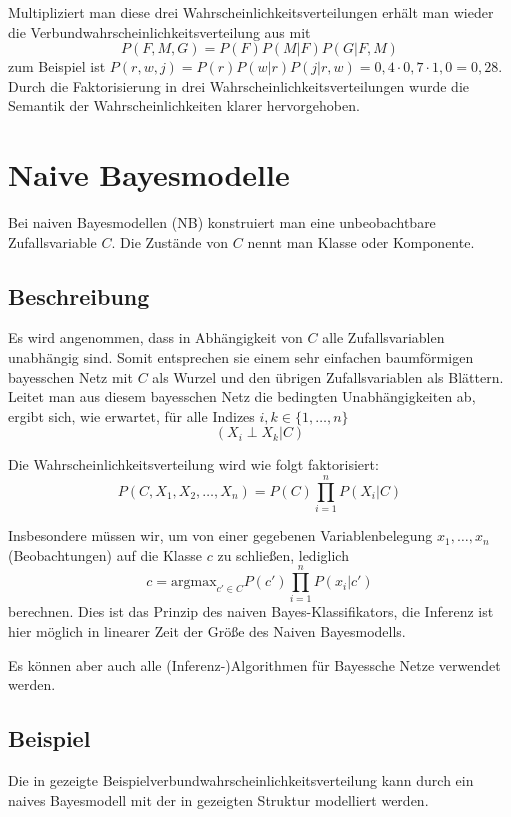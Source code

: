 \documentclass{llncs}
\begin{document}
Multipliziert man diese drei Wahrscheinlichkeitsverteilungen erhält man wieder die Verbundwahrscheinlichkeitsverteilung aus  mit 
\[P(F,M,G) = P(F) P(M|F) P(G|F,M)\]
zum Beispiel ist $ P(r,w,j) = P(r) P(w|r) P(j|r,w) = 0,4 \cdot 0,7 \cdot 1,0 = 0,28 $. Durch die Faktorisierung in drei Wahrscheinlichkeitsverteilungen wurde die Semantik der Wahrscheinlichkeiten klarer hervorgehoben. 

\section{Naive Bayesmodelle}

Bei naiven Bayesmodellen\cite{lowd2005naive} (NB) konstruiert man eine unbeobachtbare Zufallsvariable $C$. Die Zustände von $C$ nennt man Klasse oder Komponente. 

\subsection{Beschreibung}

Es wird angenommen, dass in Abhängigkeit von $C$ alle Zufallsvariablen unabhängig sind. Somit entsprechen sie einem sehr einfachen baumförmigen bayesschen Netz mit $C$ als Wurzel und den übrigen Zufallsvariablen als Blättern. Leitet man aus diesem bayesschen Netz die bedingten Unabhängigkeiten ab, ergibt sich, wie erwartet, für alle Indizes $i,k \in \{1,\dots,n\}$
\[ (X_i \perp X_k | C) \]

Die Wahrscheinlichkeitsverteilung wird wie folgt faktorisiert: 
\[ P(C,X_1,X_2,\dots,X_n) = P(C) \prod_{i=1}^n P(X_i|C) \]

Insbesondere müssen wir, um von einer gegebenen Variablenbelegung $x_1,\dots,x_n$  (Beobachtungen) 
auf die Klasse $c$ zu schließen, lediglich
\[ c = \mbox{argmax}_{c' \in C} P(c') \prod_{i=1}^n P(x_i|c') \]
berechnen. Dies ist das Prinzip des naiven Bayes-Klassifikators, die Inferenz ist hier möglich in linearer Zeit der Größe des Naiven Bayesmodells. 

Es können aber auch alle (Inferenz-)Algorithmen für Bayessche Netze verwendet werden. 

\subsection{Beispiel}

Die in  gezeigte Beispielverbundwahrscheinlichkeitsverteilung kann durch ein naives Bayesmodell mit der in  gezeigten Struktur modelliert werden. 
\end{document}
